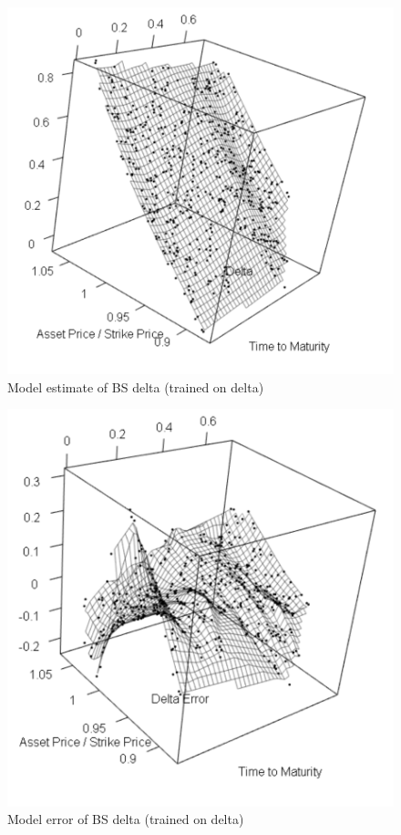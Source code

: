 \documentclass{sig-alternate-05-2015}
\begin{document}
\begin{figure}[p]
	\includegraphics[width=0.7\linewidth]{Delta_pred.png}
	\centering
	\caption{Model estimate of BS delta (trained on delta)}
			\label{fig:Delta_pred}
\end{figure} 

\begin{figure}[p]
	\includegraphics[width=0.7\linewidth]{Delta_err.png}
	\centering
	\caption{Model error of BS delta (trained on delta)}
			\label{fig:Delta_err}
\end{figure} 
\end{document}
